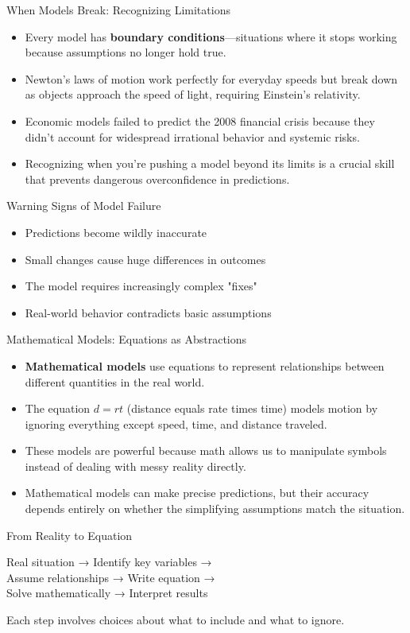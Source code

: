 \documentclass{beamer}
\begin{document}
	\begin{frame}{When Models Break: Recognizing Limitations}
		\begin{itemize}
			\item Every model has \textbf{boundary conditions}—situations where it stops working because assumptions no longer hold true.
			\item Newton's laws of motion work perfectly for everyday speeds but break down as objects approach the speed of light, requiring Einstein's relativity.
			\item Economic models failed to predict the 2008 financial crisis because they didn't account for widespread irrational behavior and systemic risks.
			\item Recognizing when you're pushing a model beyond its limits is a crucial skill that prevents dangerous overconfidence in predictions.
		\end{itemize}
		
		\begin{alertblock}{Warning Signs of Model Failure}
			\begin{itemize}
				\item Predictions become wildly inaccurate
				\item Small changes cause huge differences in outcomes  
				\item The model requires increasingly complex "fixes"
				\item Real-world behavior contradicts basic assumptions
			\end{itemize}
		\end{alertblock}
	\end{frame}
	
	\begin{frame}{Mathematical Models: Equations as Abstractions}
		\begin{itemize}
			\item \textbf{Mathematical models} use equations to represent relationships between different quantities in the real world.
			\item The equation $d = rt$ (distance equals rate times time) models motion by ignoring everything except speed, time, and distance traveled.
			\item These models are powerful because math allows us to manipulate symbols instead of dealing with messy reality directly.
			\item Mathematical models can make precise predictions, but their accuracy depends entirely on whether the simplifying assumptions match the situation.
		\end{itemize}
		
		\begin{block}{From Reality to Equation}
			\begin{center}
				Real situation → Identify key variables → \\
				Assume relationships → Write equation → \\
				Solve mathematically → Interpret results
			\end{center}
			Each step involves choices about what to include and what to ignore.
		\end{block}
	\end{frame}
	
\end{document}
